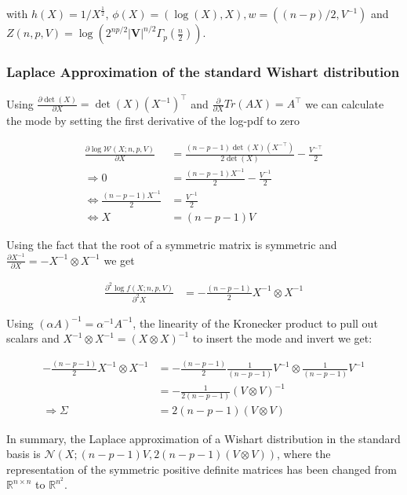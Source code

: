 with $h(X) = 1/X^{\frac{1}{2}}$, $\phi(X)=(\log(X), X), w=((n-p)/2, V^{-1})$ and $Z(n,p,V)=\log\left(2^{np/2} \left|{\mathbf V}\right|^{n/2} \Gamma_p\left(\frac {n}{2}\right )\right)$.

\subsubsection{Laplace Approximation of the standard Wishart distribution}

Using $\frac{\partial \det(X)}{\partial X} = \det(X)(X^{-1})^\top$ and $\frac{\partial}{\partial X} Tr(AX) = A^\top$ we can calculate the mode by setting the first derivative of the log-pdf to zero

\begin{align*}
\frac{\partial \log \mathcal{W}(X; n,p,V)}{\partial X} &= \frac{(n-p-1)\det(X)(X^{-\top})}{2\det(X)} - \frac{V^{-\top}}{2} \\
\Rightarrow 0 &= \frac{(n-p-1)X^{-1}}{2} - \frac{V^{-1}}{2} \\
\Leftrightarrow  \frac{(n-p-1)X^{-1}}{2} &= \frac{V^{-1}}{2} \\
\Leftrightarrow X &= (n-p-1)V
\end{align*}

Using the fact that the root of a symmetric matrix is symmetric and $\frac{\partial X^{-1}}{\partial X} = -X^{-1} \otimes X^{-1}$ we get 

\begin{align*}
\frac{\partial^2 \log f(X; n,p,V)}{\partial^2 X} &= -\frac{(n-p-1)}{2} X^{-1} \otimes X^{-1}
\end{align*}

Using $(\alpha A)^{-1} = \alpha^{-1}A^{-1}$, the linearity of the Kronecker product to pull out scalars and $X^{-1} \otimes X^{-1} = (X \otimes X)^{-1}$ to insert the mode and invert we get:

\begin{align*}
-\frac{(n-p-1)}{2} X^{-1} \otimes X^{-1} &= -\frac{(n-p-1)}{2} \frac{1}{(n-p-1)} V^{-1} \otimes \frac{1}{(n-p-1)} V^{-1} \\
&= -\frac{1}{2(n-p-1)}(V \otimes V)^{-1} \\
\Rightarrow \Sigma &= 2(n-p-1)(V \otimes V)
\end{align*}

In summary, the Laplace approximation of a Wishart distribution in the standard basis is $\mathcal{N}\left(X; (n-p-1)V, 2(n-p-1)(V \otimes V)\right)$, where the representation of the symmetric positive definite matrices has been changed from $\mathbb{R}^{n\times n}$ to $\mathbb{R}^{n^2}$.

